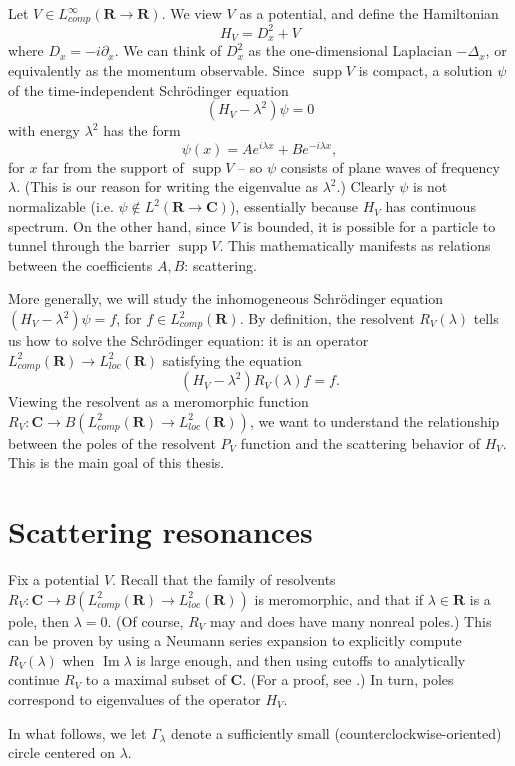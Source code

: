 \documentclass[12pt]{report}
\newcommand{\RR}{\mathbf{R}}
\newcommand{\CC}{\mathbf{C}}
\DeclareMathOperator{\supp}{supp}
\renewcommand{\Im}{\operatorname{Im}}
\theoremstyle{definition}
\theoremstyle{remark}
\begin{document}
Let $V \in L^\infty_{comp}(\RR \to \RR)$. We view $V$ as a potential, and define the Hamiltonian
$$H_V = D_x^2 + V$$
where $D_x = -i\partial_x$. We can think of $D_x^2$ as the one-dimensional Laplacian $-\Delta_x$, or equivalently as the momentum observable. Since $\supp V$ is compact, a solution $\psi$ of the time-independent Schrödinger equation
$$(H_V - \lambda^2)\psi = 0$$
with energy $\lambda^2$ has the form
$$\psi(x) = Ae^{i\lambda x} + Be^{-i\lambda x},$$
for $x$ far from the support of $\supp V$ -- so $\psi$ consists of plane waves of frequency $\lambda$. (This is our reason for writing the eigenvalue as $\lambda^2$.) Clearly $\psi$ is not normalizable (i.e. $\psi \notin L^2(\RR \to \CC)$), essentially because $H_V$ has continuous spectrum. On the other hand, since $V$ is bounded, it is possible for a particle to tunnel through the barrier $\supp V$. This mathematically manifests as relations between the coefficients $A,B$: scattering.

More generally, we will study the inhomogeneous Schrödinger equation $(H_V - \lambda^2)\psi = f$, for $f \in L^2_{comp}(\RR)$. By definition, the resolvent $R_V(\lambda)$ tells us how to solve the Schrödinger equation: it is an operator $L^2_{comp}(\RR) \to L^2_{loc}(\RR)$ satisfying the equation
$$(H_V - \lambda^2)R_V(\lambda)f = f.$$
Viewing the resolvent as a meromorphic function $R_V: \CC \to B(L^2_{comp}(\RR) \to L^2_{loc}(\RR))$, we want to understand the relationship between the poles of the resolvent $P_V$ function and the scattering behavior of $H_V$. This is the main goal of this thesis.

\section{Scattering resonances}
Fix a potential $V$. Recall that the family of resolvents $R_V: \CC \to B(L^2_{comp}(\RR) \to L^2_{loc}(\RR))$ is meromorphic, and that if $\lambda \in \RR$ is a pole, then $\lambda = 0$. (Of course, $R_V$ may and does have many nonreal poles.) This can be proven by using a Neumann series expansion to explicitly compute $R_V(\lambda)$ when $\Im \lambda$ is large enough, and then using cutoffs to analytically continue $R_V$ to a maximal subset of $\CC$. (For a proof, see \cite[Chapter 2]{dyatlov2019mathematical}.) In turn, poles correspond to eigenvalues of the operator $H_V$.

In what follows, we let $\Gamma_\lambda$ denote a sufficiently small (counterclockwise-oriented) circle centered on $\lambda$.
\end{document}

